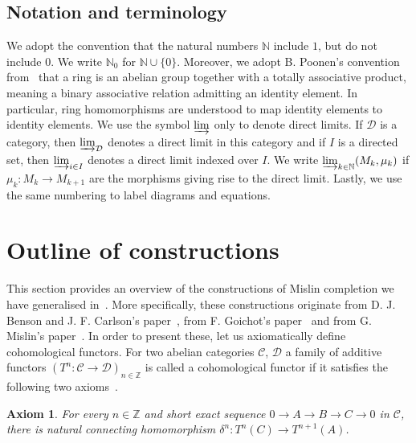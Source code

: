 \documentclass[12pt, a4paper]{article}
\numberwithin{equation}{section}
\newtheorem{axm}[thm]{Axiom}
\theoremstyle{empty}
\theoremstyle{nonumberplain}
\begin{document}
\subsection{Notation and terminology}

We adopt the convention that the natural numbers $\mathbb{N}$ include $1$, but do not include $0$. We write $\mathbb{N}_0$ for $\mathbb{N} \cup \lbrace 0 \rbrace$. Moreover, we adopt B.\! Poonen's convention from~\cite{poo18} that a ring is an abelian group together with a totally associative product, meaning a binary associative relation admitting an identity element. In particular, ring homomorphisms are understood to map identity elements to identity elements. We use the symbol $\varinjlim$ only to denote direct limits. If $\mathcal{D}$ is a category, then $\varinjlim_{\mathcal{D}}$ denotes a direct limit in this category and if $I$ is a directed set, then $\varinjlim_{i \in I}$ denotes a direct limit indexed over $I$. We write $\varinjlim_{k \in \mathbb{N}} (M_k, \mu_k)$ if $\mu_k: M_k \rightarrow M_{k+1}$ are the morphisms giving rise to the direct limit. Lastly, we use the same numbering to label diagrams and equations.

\section{Outline of constructions}\label{sec:constructions}

This section provides an overview of the constructions of Mislin completion we have generalised in~\cite{ghe24}. More specifically, these constructions originate from D.\! J.\! Benson and J.\! F.\! Carlson's paper~\cite{ben92}, from F.\! Goichot's paper~\cite{goi92} and from G.\! Mislin's paper~\cite{mis94}. In order to present these, let us axiomatically define cohomological functors. For two abelian categories $\mathcal{C}$, $\mathcal{D}$ a family of additive functors $(T^n: \mathcal{C} \rightarrow \mathcal{D})_{n \in \mathbb{Z}}$ is called a cohomological functor if it satisfies the following two axioms~\cite[p.~201--202]{kro95}.

\begin{axm}\label{axm:delta}
For every $n \in \mathbb{Z}$ and short exact sequence $0 \rightarrow A \rightarrow B \rightarrow C \rightarrow 0$ in $\mathcal{C}$, there is natural connecting homomorphism $\delta^n: T^n(C) \rightarrow T^{n+1}(A)$.
\end{axm}
\end{document}
